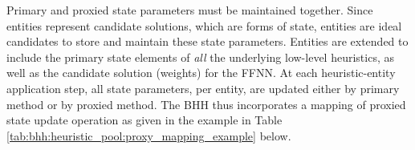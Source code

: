 Primary and proxied state parameters must be maintained together. Since entities represent candidate solutions, which are forms of state, entities are ideal candidates to store and maintain these state parameters. Entities are extended to include the primary state elements of \textit{all} the underlying low-level heuristics, as well as the candidate solution (weights) for the \acs{FFNN}. At each heuristic-entity application step, all state parameters, per entity, are updated either by primary method or by proxied method. The \acs{BHH} thus incorporates a mapping of proxied state update operation as given in the example in Table \ref{tab:bhh:heuristic_pool:proxy_mapping_example} below.

\begin{table}[htbp]
      \centering
      \caption{An example of mapping of proxied state update operation maintained by the \acs{BHH}.}
      \label{tab:bhh:heuristic_pool:proxy_mapping_example}%
      \par\bigskip
\end{table}%

